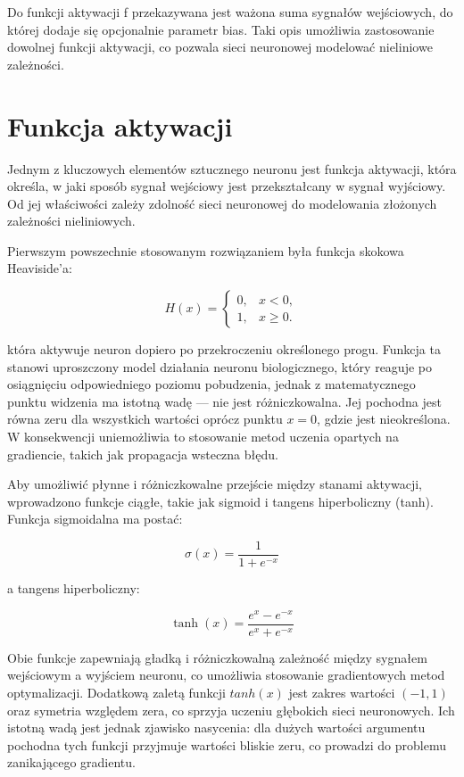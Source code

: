 Do funkcji aktywacji f przekazywana jest ważona suma sygnałów wejściowych, do której dodaje się opcjonalnie parametr bias. Taki opis umożliwia zastosowanie dowolnej funkcji aktywacji, co pozwala sieci neuronowej modelować nieliniowe zależności. 

\section{Funkcja aktywacji}

Jednym z kluczowych elementów sztucznego neuronu jest funkcja aktywacji, która określa, w jaki sposób sygnał wejściowy jest przekształcany w sygnał wyjściowy. Od jej właściwości zależy zdolność sieci neuronowej do modelowania złożonych zależności nieliniowych.

Pierwszym powszechnie stosowanym rozwiązaniem była funkcja skokowa Heaviside’a:

\[
H(x) =
\begin{cases}
	0, & x < 0,\\
	1, & x \ge 0.
\end{cases}
\]

która aktywuje neuron dopiero po przekroczeniu określonego progu. Funkcja ta stanowi uproszczony model działania neuronu biologicznego, który reaguje po osiągnięciu odpowiedniego poziomu pobudzenia, jednak z matematycznego punktu widzenia ma istotną wadę — nie jest różniczkowalna. Jej pochodna jest równa zeru dla wszystkich wartości oprócz punktu $x=0$, gdzie jest nieokreślona. W konsekwencji uniemożliwia to stosowanie metod uczenia opartych na gradiencie, takich jak propagacja wsteczna błędu.

Aby umożliwić płynne i różniczkowalne przejście między stanami aktywacji, wprowadzono funkcje ciągłe, takie jak sigmoid i tangens hiperboliczny (tanh). Funkcja sigmoidalna ma postać:

\[
\sigma(x) = \frac{1}{1 + e^{-x}}
\]

a tangens hiperboliczny:

\[
\tanh(x) = \frac{e^{x} - e^{-x}}{e^{x} + e^{-x}}
\]

Obie funkcje zapewniają gładką i różniczkowalną zależność między sygnałem wejściowym a wyjściem neuronu, co umożliwia stosowanie gradientowych metod optymalizacji. Dodatkową zaletą funkcji $tanh(x)$ jest zakres wartości $(-1,1)$ oraz symetria względem zera, co sprzyja uczeniu głębokich sieci neuronowych. Ich istotną wadą jest jednak zjawisko nasycenia: dla dużych wartości argumentu pochodna tych funkcji przyjmuje wartości bliskie zeru, co prowadzi do problemu zanikającego gradientu.


